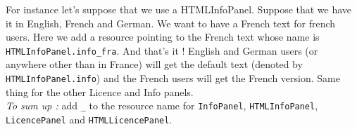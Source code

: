 For instance let's suppose that we use a HTMLInfoPanel. Suppose that we have it
in English, French and German. We want to have a French text for french users.
Here we add a resource pointing to the French text whose name is
\texttt{HTMLInfoPanel.info\_fra}. And that's it ! English and German users (or
anywhere other than in France) will get the default text (denoted by 
\texttt{HTMLInfoPanel.info}) and the French users will get the French version.
Same thing for the other Licence and Info panels.\\

\noindent
\textit{To sum up :} add \texttt{\_<iso3 code>} to the resource name for
\texttt{InfoPanel}, \texttt{HTMLInfoPanel}, \texttt{LicencePanel} and
\texttt{HTMLLicencePanel}.\\
